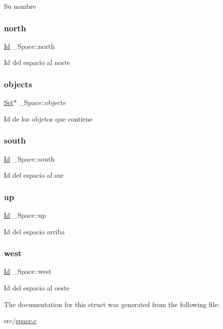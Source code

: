 Su nombre \mbox{\label{struct__Space_ae5ebe53ce79514d7d2d93911e0159252}} 
\subsubsection{\texorpdfstring{north}{north}}
{\footnotesize\ttfamily \hyperlink{types_8h_a845e604fb28f7e3d97549da3448149d3}{Id} \+\_\+\+Space\+::north}

Id del espacio al norte \mbox{\label{struct__Space_a661ed8b0fc8085b6db70188aa5085625}} 
\subsubsection{\texorpdfstring{objects}{objects}}
{\footnotesize\ttfamily \hyperlink{set_8h_a6d3b7f7c92cbb4577ef3ef7ddbf93161}{Set}$\ast$ \+\_\+\+Space\+::objects}

Id de los objetos que contiene \mbox{\label{struct__Space_a646b68c22a0bbf1685033c96109d31d1}} 
\subsubsection{\texorpdfstring{south}{south}}
{\footnotesize\ttfamily \hyperlink{types_8h_a845e604fb28f7e3d97549da3448149d3}{Id} \+\_\+\+Space\+::south}

Id del espacio al sur \mbox{\label{struct__Space_af2a50145d93dfb8d82b8b42138dc57a1}} 
\subsubsection{\texorpdfstring{up}{up}}
{\footnotesize\ttfamily \hyperlink{types_8h_a845e604fb28f7e3d97549da3448149d3}{Id} \+\_\+\+Space\+::up}

Id del espacio arriba \mbox{\label{struct__Space_a20c1d259e93b44e24ba82982e142eb9b}} 
\subsubsection{\texorpdfstring{west}{west}}
{\footnotesize\ttfamily \hyperlink{types_8h_a845e604fb28f7e3d97549da3448149d3}{Id} \+\_\+\+Space\+::west}

Id del espacio al oeste 

The documentation for this struct was generated from the following file\+:\begin{DoxyCompactItemize}
\item 
src/\hyperlink{space_8c}{space.\+c}\end{DoxyCompactItemize}
